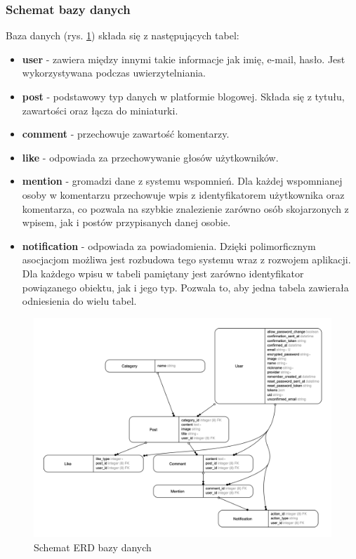 \documentclass[declaration,shortabstract,polish,inz]{iithesis}
\begin{document}
\subsubsection{Schemat bazy danych}
Baza danych (rys. \ref{fig:erd_diagram}) składa się z następujących tabel: 
\begin{itemize}
    \item \textbf{user} - zawiera między innymi takie informacje jak imię, e-mail, hasło. Jest wykorzystywana podczas uwierzytelniania.
    \item \textbf{post} - podstawowy typ danych w platformie blogowej. Składa się z tytułu, zawartości oraz łącza do miniaturki.
    \item \textbf{comment} - przechowuje zawartość komentarzy.
    \item \textbf{like} - odpowiada za przechowywanie głosów użytkowników.
    \item \textbf{mention} - gromadzi dane z systemu wspomnień. Dla każdej wspomnianej osoby w komentarzu przechowuje wpis z identyfikatorem użytkownika oraz komentarza, co pozwala na szybkie znalezienie zarówno osób skojarzonych z wpisem, jak i postów przypisanych danej osobie.
    \item \textbf{notification} - odpowiada za powiadomienia. Dzięki polimorficznym asocjacjom możliwa jest rozbudowa tego systemu wraz z rozwojem aplikacji. Dla każdego wpisu w tabeli pamiętany jest zarówno identyfikator powiązanego obiektu, jak i jego typ. Pozwala to, aby jedna tabela zawierała odniesienia do wielu tabel.
\end{itemize}
\begin{figure}[H]
    \centering
    \includegraphics[width=\textwidth]{images/erd.png}
    \caption{Schemat ERD bazy danych}
    \label{fig:erd_diagram}
\end{figure}
\end{document}
